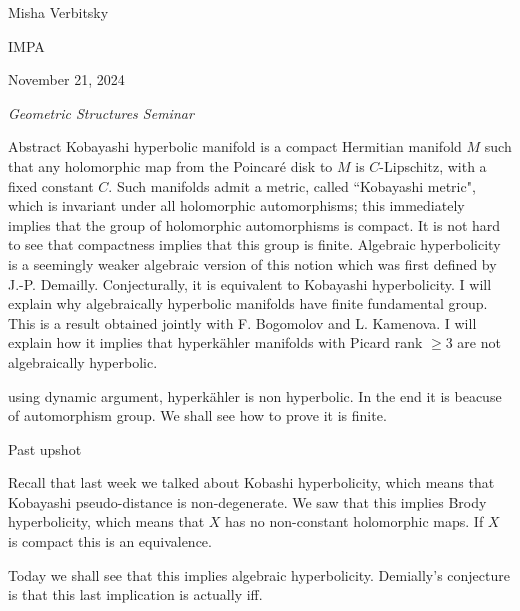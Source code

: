 \hfill{\Large Misha Verbitsky}

{\Large \hfill IMPA}

\hfill{\large November 21, 2024

\hfill \textit{Geometric Structures Seminar}}
\vspace{2em}

\begin{thing6}{Abstract}
Kobayashi hyperbolic manifold is a compact Hermitian manifold \(M\) such that any holomorphic map from the Poincaré disk to \(M\) is \(C\)-Lipschitz, with a fixed constant \(C\). Such manifolds admit a metric, called ``Kobayashi metric", which is invariant under all holomorphic automorphisms; this immediately implies that the group of holomorphic automorphisms is compact. It is not hard to see that compactness implies that this group is finite. Algebraic hyperbolicity is a seemingly weaker algebraic version of this notion which was first defined by J.-P. Demailly. Conjecturally, it is equivalent to Kobayashi hyperbolicity. I will explain why algebraically hyperbolic manifolds have finite fundamental group. This is a result obtained jointly with F. Bogomolov and L. Kamenova. I will explain how it implies that  hyperkähler manifolds with Picard rank \(\geq 3\) are not algebraically hyperbolic.
\end{thing6}
\vspace{2em}
\begin{upshot}\leavevmode
using dynamic argument, hyperkähler is non hyperbolic. In the end it is beacuse of automorphism group. We shall see how to prove it is finite.
\end{upshot}
\begin{thing3}{Past upshot}\leavevmode
	
Recall that last week we talked about Kobashi hyperbolicity, which means that Kobayashi pseudo-distance is non-degenerate. We saw that this implies Brody hyperbolicity, which means that $X$ has no non-constant holomorphic maps. If $X$ is compact this is an equivalence.

Today we shall see that this implies algebraic hyperbolicity. Demially's conjecture is that this last implication is actually iff.
\end{thing3}

